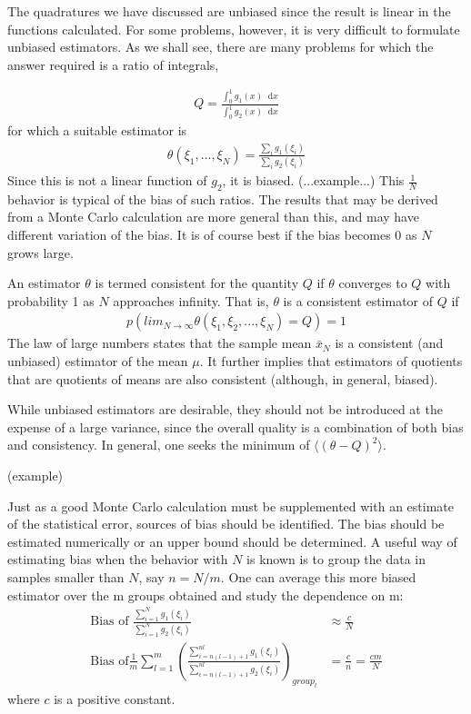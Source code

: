 \documentclass[twoside,english]{uiofysmaster}
\newcommand*\dif{\mathop{}\!\mathrm{d}}
\begin{document}
The quadratures we have discussed are unbiased since the result is linear in the functions calculated. For some problems, however, it is very difficult to formulate unbiased estimators. As we shall see, there are many problems for which the answer required is a ratio of integrals,

\begin{align}
	Q = \frac{\int_0^1 g_1 (x) \dif x}{\int_0^1 g_2 (x) \dif x} 
\end{align}
for which a suitable estimator is
\begin{align}
	\theta (\xi_1, ..., \xi_N) = \frac{\sum_i g_1 (\xi_i)}{\sum_i g_2 (\xi_i)}
\end{align}
Since this is not a linear function of $g_2$, it is biased. (...example...) This $\frac{1}{N}$ behavior is typical of the bias of such ratios. The results that may be derived from a Monte Carlo calculation are more general than this, and may have different variation of the bias. It is of course best if the bias becomes 0 as $N$ grows large.

An estimator $\theta$ is termed consistent for the quantity $Q$ if $\theta$ converges to $Q$ with probability 1 as $N$ approaches infinity. That is, $\theta$ is a consistent estimator of $Q$ if 
\begin{align}
	p(lim_{N\rightarrow \infty} \theta (\xi_1, \xi_2, ..., \xi_N)=Q) =1 
\end{align}
The law of large numbers states that the sample mean $\bar{x}_N$ is a consistent (and unbiased) estimator of the mean $\mu$. It further implies that estimators of quotients that are quotients of means are also consistent (although, in general, biased).

While unbiased estimators are desirable, they should not be introduced at the expense of a large variance, since the overall quality is a combination of both bias and consistency. In general, one seeks the minimum of $\langle (\theta -Q)^2 \rangle$. 

(example)

Just as a good Monte Carlo calculation must be supplemented with an estimate of the statistical error, sources of bias should be identified. The bias should be estimated numerically or an upper bound should be determined. A useful way of estimating bias when the behavior with $N$ is known is to group the data in samples smaller than $N$, say $n=N/m$. One can average this more biased estimator over the m groups obtained and study the dependence on m:
\begin{align}
	\text{Bias of } \frac{\sum_{i=1}^N g_1 (\xi_i)}{\sum_{i=1}^N g_2 (\xi_i)}
	&\approx \frac{c}{N} \\
	\text{Bias of} \frac{1}{m} \sum_{l=1}^m (\frac{\sum_{i=n(l-1)+1}^{nl} g_1 (\xi_i)}
	{\sum_{i=n(l-1)+1}^{nl} g_2 (\xi_i)})_{group_l}
	&= \frac{c}{n} = \frac{cm}{N}
\end{align}
where $c$ is a positive constant.
\end{document}

